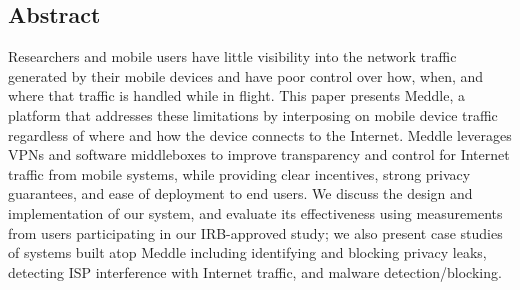 \subsection*{Abstract}
Researchers and mobile users have little visibility into the network 
traffic generated by their mobile devices and have poor control over 
how, when, and where that traffic is handled while in flight. 
This paper presents Meddle, a platform that 
addresses these limitations by interposing on mobile 
device traffic regardless of where and how the device connects to the Internet.
Meddle leverages 
VPNs and software middleboxes to improve transparency and control 
for Internet traffic from mobile systems, while providing clear incentives, strong privacy guarantees, 
and ease of deployment to end users. We discuss 
the design and implementation of our system, and evaluate its effectiveness using 
measurements from users participating in our IRB-approved study; we also present case studies of systems built atop Meddle including
identifying and blocking privacy leaks, detecting ISP interference with Internet traffic, and malware detection/blocking.







